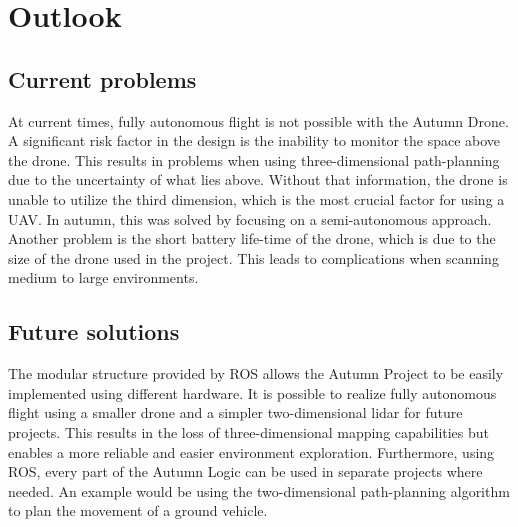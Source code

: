 \section{Outlook}

\subsection{Current problems}
At current times, fully autonomous flight is not possible with the Autumn Drone. A significant risk factor in the design is the inability to monitor the space above the drone. This results in problems when using three-dimensional path-planning due to the uncertainty of what lies above. Without that information, the drone is unable to utilize the third dimension, which is the most crucial factor for using a UAV. In autumn, this was solved by focusing on a semi-autonomous approach.  
Another problem is the short battery life-time of the drone, which is due to the size of the drone used in the project. This leads to complications when scanning medium to large environments.  

\subsection{Future solutions}
The modular structure provided by ROS allows the Autumn Project to be easily implemented using different hardware. It is possible to realize fully autonomous flight using a smaller drone and a simpler two-dimensional lidar for future projects. This results in the loss of three-dimensional mapping capabilities but enables a more reliable and easier environment exploration.\newline 
Furthermore, using ROS, every part of the Autumn Logic can be used in separate projects where needed.
An example would be using the two-dimensional path-planning algorithm to plan the movement of a ground vehicle. 

\filbreak
